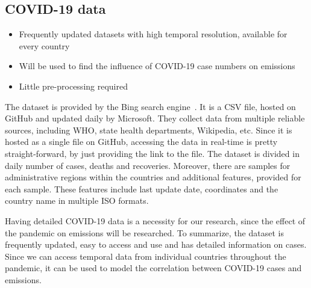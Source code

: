 








\subsection*{COVID-19 data}
\begin{itemize}
	\item Frequently updated datasets with high temporal resolution, available for every country
	\item Will be used to find the influence of COVID-19 case numbers on \co emissions
	\item Little pre-processing required
\end{itemize}

The dataset is provided by the Bing search engine~\cite{Bing}. It is a CSV file, hosted on GitHub and updated daily by Microsoft. They collect data from multiple reliable sources, including WHO, state health departments, Wikipedia, etc.
Since it is hosted as a single file on GitHub, accessing the data in real-time is pretty straight-forward, by just providing the link to the file. The dataset is divided in daily number of cases, deaths and recoveries. Moreover, there are samples for administrative regions within the countries and additional features, provided for each sample. These features  include last update date, coordinates and the country name in multiple ISO formats.

Having detailed COVID-19 data is a necessity for our research, since the effect of the pandemic on \co emissions will be researched. To summarize, the dataset is frequently updated, easy to access and use and has detailed information on cases. Since we can access temporal data from individual countries throughout the pandemic, it can be used to model the correlation between COVID-19 cases and \co emissions.


